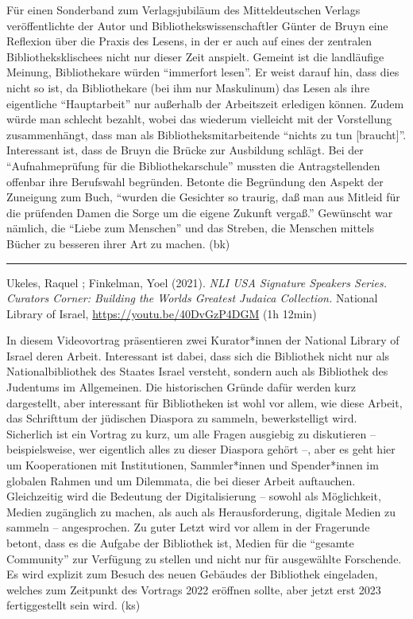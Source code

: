 \documentclass[a4paper,
fontsize=11pt,
oneside,
numbers=noperiodatend,
parskip=half-,
bibliography=totoc,
final
]{scrartcl}
\begin{document}
Für einen Sonderband zum Verlagsjubiläum des Mitteldeutschen Verlags
veröffentlichte der Autor und Bibliothekswissenschaftler Günter de Bruyn
eine Reflexion über die Praxis des Lesens, in der er auch auf eines der
zentralen Bibliotheksklischees nicht nur dieser Zeit anspielt. Gemeint
ist die landläufige Meinung, Bibliothekare würden \enquote{immerfort
lesen}. Er weist darauf hin, dass dies nicht so ist, da Bibliothekare
(bei ihm nur Maskulinum) das Lesen als ihre eigentliche
\enquote{Hauptarbeit} nur außerhalb der Arbeitszeit erledigen können.
Zudem würde man schlecht bezahlt, wobei das wiederum vielleicht mit der
Vorstellung zusammenhängt, dass man als Bibliotheksmitarbeitende
\enquote{nichts zu tun {[}braucht{]}}. Interessant ist, dass de Bruyn
die Brücke zur Ausbildung schlägt. Bei der \enquote{Aufnahmeprüfung für
die Bibliothekarschule} mussten die Antragstellenden offenbar ihre
Berufswahl begründen. Betonte die Begründung den Aspekt der Zuneigung
zum Buch, \enquote{wurden die Gesichter so traurig, daß man aus Mitleid
für die prüfenden Damen die Sorge um die eigene Zukunft vergaß.}
Gewünscht war nämlich, die \enquote{Liebe zum Menschen} und das Streben,
die Menschen mittels Bücher zu besseren ihrer Art zu machen. (bk)

\begin{center}\rule{0.5\linewidth}{0.5pt}\end{center}

Ukeles, Raquel ; Finkelman, Yoel (2021). \emph{NLI USA Signature
Speakers Series. Curators Corner: Building the World\textquotesingle s
Greatest Judaica Collection.} National Library of Israel, \url{https://youtu.be/40DvGzP4DGM} (1h 12min)

In diesem Videovortrag präsentieren zwei Kurator*innen der National
Library of Israel deren Arbeit. Interessant ist dabei, dass sich die
Bibliothek nicht nur als Nationalbibliothek des Staates Israel versteht,
sondern auch als Bibliothek des Judentums im Allgemeinen. Die
historischen Gründe dafür werden kurz dargestellt, aber interessant für
Bibliotheken ist wohl vor allem, wie diese Arbeit, das Schrifttum der
jüdischen Diaspora zu sammeln, bewerkstelligt wird. Sicherlich ist ein
Vortrag zu kurz, um alle Fragen ausgiebig zu diskutieren --
beispielsweise, wer eigentlich alles zu dieser Diaspora gehört --, aber
es geht hier um Kooperationen mit Institutionen, Sammler*innen und
Spender*innen im globalen Rahmen und um Dilemmata, die bei dieser Arbeit
auftauchen. Gleichzeitig wird die Bedeutung der Digitalisierung --
sowohl als Möglichkeit, Medien zugänglich zu machen, als auch als
Herausforderung, digitale Medien zu sammeln -- angesprochen. Zu guter
Letzt wird vor allem in der Fragerunde betont, dass es die Aufgabe der
Bibliothek ist, Medien für die \enquote{gesamte Community} zur Verfügung
zu stellen und nicht nur für ausgewählte Forschende. Es wird explizit
zum Besuch des neuen Gebäudes der Bibliothek eingeladen, welches zum
Zeitpunkt des Vortrags 2022 eröffnen sollte, aber jetzt erst 2023
fertiggestellt sein wird. (ks)
\end{document}
